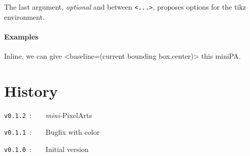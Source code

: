 \documentclass{article}
\begin{document}
The last argument, \textit{optional} and between \texttt{<...>}, proposes options for the \textsf{tikz} environment.

\subsection{Examples}

\begin{PresentationCode}{}
\end{PresentationCode}

\begin{PresentationCode}{}
Inline, we can give <baseline=(current bounding box.center)>
this miniPA.
\end{PresentationCode}

\pagebreak

\part{History}

\verb|v0.1.2|~:~~~~\textit{mini-}PixelArts

\verb|v0.1.1|~:~~~~Bugfix with color

\verb|v0.1.0|~:~~~~Initial version
\end{document}
